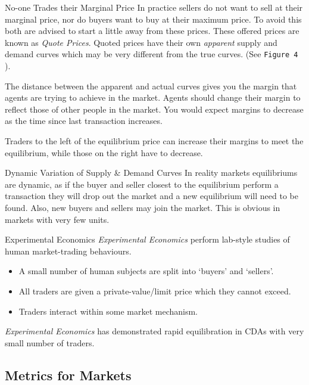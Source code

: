 \documentclass[11pt,a4paper]{article}
\begin{document}
\begin{proposition}{No-one Trades their Marginal Price}
  In practice sellers do not want to sell at their marginal price, nor do buyers want to buy at their maximum price. To avoid this both are advised to start a little away from these prices. These offered prices are known as \textit{Quote Prices}. Quoted prices have their own \textit{apparent} supply and demand curves which may be very different from the true curves. (See \texttt{Figure 4} ).
  \par The distance between the apparent and actual curves gives you the margin that agents are trying to achieve in the market. Agents should change their margin to reflect those of other people in the market. You would expect margins to decrease as the time since last transaction increases.
  \par Traders to the left of the equilibrium price can increase their margins to meet the equilibrium, while those on the right have to decrease.
\end{proposition}

\begin{proposition}{Dynamic Variation of Supply \& Demand Curves}
  In reality markets equilibriums are dynamic, as if the buyer and seller closest to the equilibrium perform a transaction they will drop out the market and a new equilibrium will need to be found. Also, new buyers and sellers may join the market. This is obvious in markets with very few units.
\end{proposition}

\begin{definition}{Experimental Economics}
  \textit{Experimental Economics} perform lab-style studies of human market-trading behaviours.
  \begin{itemize}
    \item A small number of human subjects are split into `buyers' and `sellers'.
    \item All traders are given a private-value/limit price which they cannot exceed.
    \item Traders interact within some market mechanism.
  \end{itemize}
  \textit{Experimental Economics} has demonstrated rapid equilibration in CDAs with very small number of traders.
\end{definition}

\subsection{Metrics for Markets}
\end{document}
